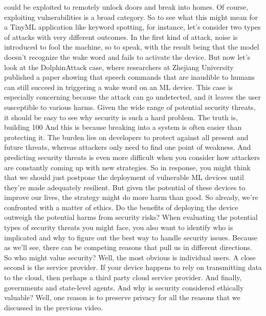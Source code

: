     could be exploited to remotely unlock doors and break into homes.
    Of course, exploiting vulnerabilities is a broad category.
    So to see what this might mean for a TinyML application
    like keyword spotting, for instance, let's consider
    two types of attacks with very different outcomes.
    In the first kind of attack, noise is introduced
    to fool the machine, so to speak, with the result being
    that the model doesn't recognize the wake word
    and fails to activate the device.
    But now let's look at the DolphinAttack case,
    where researchers at Zhejiang University published a paper showing
    that speech commands that are inaudible to humans
    can still succeed in triggering a wake word on an ML device.
    This case is especially concerning because the attack can go undetected,
    and it leaves the user susceptible to various harms.
    Given the wide range of potential security threats,
    it should be easy to see why security is such a hard problem.
    The truth is, building 100%
    And this is because breaking into a system
    is often easier than protecting it.
    The burden lies on developers to protect against all present and future threats,
    whereas attackers only need to find one point of weakness.
    And predicting security threats is even more difficult
    when you consider how attackers are constantly
    coming up with new strategies.
    So in response, you might think that we should just
    postpone the deployment of vulnerable ML devices
    until they're made adequately resilient.
    But given the potential of these devices to improve our lives,
    the strategy might do more harm than good.
    So already, we're confronted with a matter of ethics.
    Do the benefits of deploying the device outweigh the potential harms
    from security risks?
    When evaluating the potential types of security threats you might face,
    you also want to identify who is implicated
    and why to figure out the best way to handle security issues.
    Because as we'll see, there can be competing reasons
    that pull us in different directions.
    So who might value security?
    Well, the most obvious is individual users.
    A close second is the service provider.
    If your device happens to rely on transmitting data to the cloud,
    then perhaps a third party cloud service provider.
    And finally, governments and state-level agents.
    And why is security considered ethically valuable?
    Well, one reason is to preserve privacy for all the reasons
    that we discussed in the previous video.
